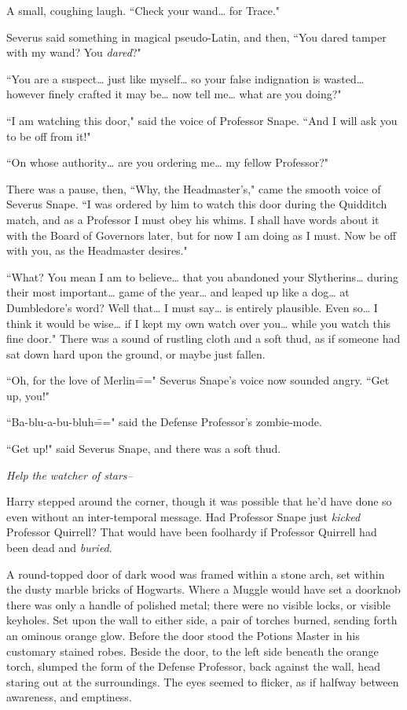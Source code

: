 A small, coughing laugh. ``Check your wand{\ldots} for Trace."

Severus said something in magical pseudo-Latin, and then, ``You dared tamper with my wand? You \emph{dared}?"

``You are a suspect{\ldots} just like myself{\ldots} so your false indignation is wasted{\ldots} however finely crafted it may be{\ldots} now tell me{\ldots} what are you doing?"

``I am watching this door," said the voice of Professor Snape. ``And I will ask you to be off from it!"

``On whose authority{\ldots} are you ordering me{\ldots} my fellow Professor?"

There was a pause, then, ``Why, the Headmaster's," came the smooth voice of Severus Snape. ``I was ordered by him to watch this door during the Quidditch match, and as a Professor I must obey his whims. I shall have words about it with the Board of Governors later, but for now I am doing as I must. Now be off with you, as the Headmaster desires."

``What? You mean I am to believe{\ldots} that you abandoned your Slytherins{\ldots} during their most important{\ldots} game of the year{\ldots} and leaped up like a dog{\ldots} at Dumbledore's word? Well that{\ldots} I must say{\ldots} is entirely plausible. Even so{\ldots} I think it would be wise{\ldots} if I kept my own watch over you{\ldots} while you watch this fine door." There was a sound of rustling cloth and a soft thud, as if someone had sat down hard upon the ground, or maybe just fallen.

``Oh, for the love of Merlin\===" Severus Snape's voice now sounded angry. ``Get up, you!"

``Ba-blu-a-bu-bluh\===" said the Defense Professor's zombie-mode.

``Get up!" said Severus Snape, and there was a soft thud.

\emph{Help the watcher of stars\---}

Harry stepped around the corner, though it was possible that he'd have done so even without an inter-temporal message. Had Professor Snape just \emph{kicked} Professor Quirrell? That would have been foolhardy if Professor Quirrell had been dead and \emph{buried}.

A round-topped door of dark wood was framed within a stone arch, set within the dusty marble bricks of Hogwarts. Where a Muggle would have set a doorknob there was only a handle of polished metal; there were no visible locks, or visible keyholes. Set upon the wall to either side, a pair of torches burned, sending forth an ominous orange glow. Before the door stood the Potions Master in his customary stained robes. Beside the door, to the left side beneath the orange torch, slumped the form of the Defense Professor, back against the wall, head staring out at the surroundings. The eyes seemed to flicker, as if halfway between awareness, and emptiness.

